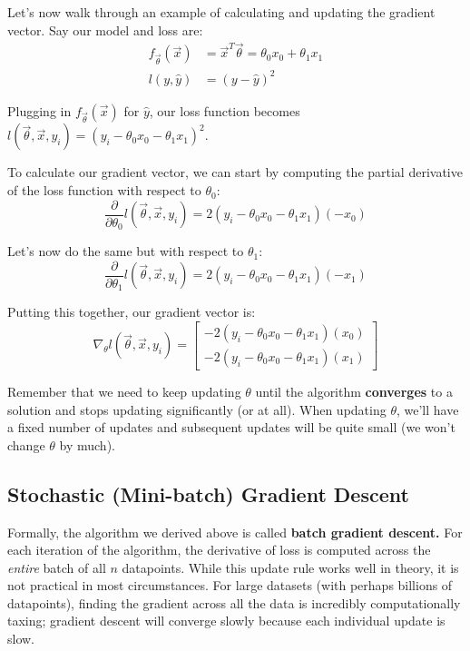 \documentclass[
  letterpaper,
  DIV=11,
  numbers=noendperiod]{scrreprt}
\begin{document}
Let's now walk through an example of calculating and updating the
gradient vector. Say our model and loss are: \[\begin{align}
f_{\vec{\theta}}(\vec{x}) &= \vec{x}^T\vec{\theta} = \theta_0x_0 + \theta_1x_1
\\l(y, \hat{y}) &= (y - \hat{y})^2
\end{align}
\]

Plugging in \(f_{\vec{\theta}}(\vec{x})\) for \(\hat{y}\), our loss
function becomes
\(l(\vec{\theta}, \vec{x}, y_i) = (y_i - \theta_0x_0 - \theta_1x_1)^2\).

To calculate our gradient vector, we can start by computing the partial
derivative of the loss function with respect to \(\theta_0\):
\[\frac{\partial}{\partial \theta_{0}} l(\vec{\theta}, \vec{x}, y_i) = 2(y_i - \theta_0x_0 - \theta_1x_1)(-x_0)\]

Let's now do the same but with respect to \(\theta_1\):
\[\frac{\partial}{\partial \theta_{1}} l(\vec{\theta}, \vec{x}, y_i) = 2(y_i - \theta_0x_0 - \theta_1x_1)(-x_1)\]

Putting this together, our gradient vector is:
\[\nabla_{\theta} l(\vec{\theta}, \vec{x}, y_i) =  \begin{bmatrix} -2(y_i - \theta_0x_0 - \theta_1x_1)(x_0) \\ -2(y_i - \theta_0x_0 - \theta_1x_1)(x_1) \end{bmatrix}\]

Remember that we need to keep updating \(\theta\) until the algorithm
\textbf{converges} to a solution and stops updating significantly (or at
all). When updating \(\theta\), we'll have a fixed number of updates and
subsequent updates will be quite small (we won't change \(\theta\) by
much).

\subsection{Stochastic (Mini-batch) Gradient
Descent}\label{stochastic-mini-batch-gradient-descent}

Formally, the algorithm we derived above is called \textbf{batch
gradient descent.} For each iteration of the algorithm, the derivative
of loss is computed across the \emph{entire} batch of all \(n\)
datapoints. While this update rule works well in theory, it is not
practical in most circumstances. For large datasets (with perhaps
billions of datapoints), finding the gradient across all the data is
incredibly computationally taxing; gradient descent will converge slowly
because each individual update is slow.
\end{document}
